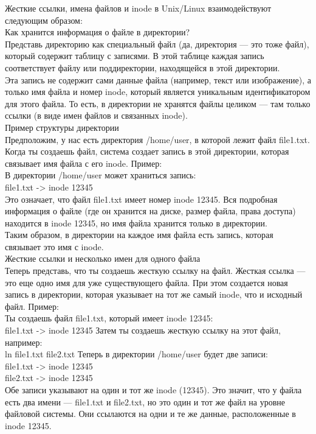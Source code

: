 \noindent Жесткие ссылки, имена файлов и inode в Unix/Linux взаимодействуют следующим образом: \\
Как хранится информация о файле в директории? \\
Представь директорию как специальный файл (да, директория — это тоже файл), который содержит таблицу с записями. В этой таблице каждая запись соответствует файлу или поддиректории, находящейся в этой директории. \\
Эта запись не содержит сами данные файла (например, текст или изображение), а только имя файла и номер inode, который является уникальным идентификатором для этого файла. То есть, в директории не хранятся файлы целиком — там только ссылки (в виде имен файлов и связанных inode). \\
Пример структуры директории \\
Предположим, у нас есть директория /home/user, в которой лежит файл file1.txt. Когда ты создаешь файл, система создает запись в этой директории, которая связывает имя файла с его inode. Пример: \\
В директории /home/user может храниться запись: \\
file1.txt -> inode 12345 \\
Это означает, что файл file1.txt имеет номер inode 12345. Вся подробная информация о файле (где он хранится на диске, размер файла, права доступа) находится в inode 12345, но имя файла хранится только в директории. \\
Таким образом, в директории на каждое имя файла есть запись, которая связывает это имя с inode. \\
Жесткие ссылки и несколько имен для одного файла \\
Теперь представь, что ты создаешь жесткую ссылку на файл. Жесткая ссылка — это еще одно имя для уже существующего файла. При этом создается новая запись в директории, которая указывает на тот же самый inode, что и исходный файл. Пример: \\
Ты создаешь файл file1.txt, который имеет inode 12345: \\
file1.txt -> inode 12345
Затем ты создаешь жесткую ссылку на этот файл, например: \\
ln file1.txt file2.txt
Теперь в директории /home/user будет две записи: \\
file1.txt -> inode 12345 \\
file2.txt -> inode 12345 \\
Обе записи указывают на один и тот же inode (12345). Это значит, что у файла есть два имени — file1.txt и file2.txt, но это один и тот же файл на уровне файловой системы. Они ссылаются на одни и те же данные, расположенные в inode 12345. \\

